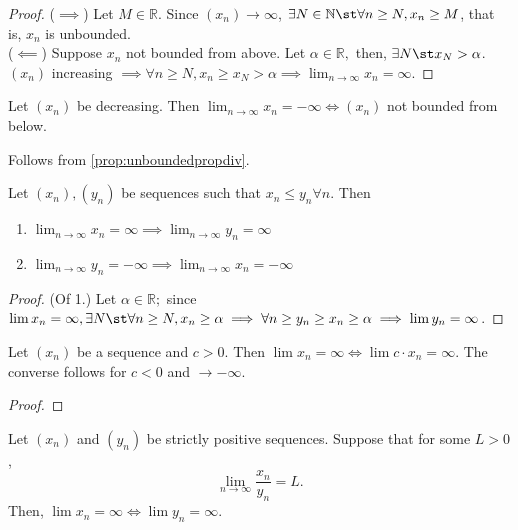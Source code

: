 \documentclass[12pt]{article}
\begin{document}
\begin{proof}
  ($\implies$) Let $M \in \mathbb{R}$. Since $(x_n) \to \infty$, $\exists N \in \mathbb{N} \st \forall n \geq N, x_n \geq M$, that is, $x_n$ is unbounded.\\
  ($\impliedby$) Suppose $x_n$ not bounded from above. Let $\alpha \in \mathbb{R},$ then, $\exists N \st x_N > \alpha$. $(x_n)$ increasing $\implies \forall n \geq N, x_n \geq x_N > \alpha \implies \lim_{n\to\infty} x_n = \infty$.
\end{proof}
\begin{proposition}
  Let $(x_n)$ be decreasing. Then $\lim_{n\to\infty} x_n = - \infty \iff (x_n)$ not bounded from below.
\end{proposition}
\begin{remark}
  Follows from \cref{prop:unboundedpropdiv}.
\end{remark}

\begin{proposition}
  Let $(x_n), (y_n)$ be sequences such that $x_n \leq y_n \forall n$. Then \begin{enumerate}
    \item $\lim_{n\to\infty} x_n = \infty \implies \lim_{n\to\infty} y_n = \infty$
    \item $\lim_{n\to\infty} y_n = -\infty \implies \lim_{n\to\infty} x_n = -\infty$
  \end{enumerate}
\end{proposition}

\begin{proof}(Of 1.) Let $\alpha \in \mathbb{R};$ since $\lim x_n = \infty, \exists N \st \forall n \geq N, x_n \geq \alpha \implies \forall n \geq y_n \geq x_n \geq \alpha \implies \lim y_n = \infty$.
\end{proof}

\begin{proposition}
  Let $(x_n)$ be a sequence and $c > 0$. Then $\lim x_n = \infty \iff \lim c \cdot x_n = \infty$. The converse follows for $c < 0$ and $\to - \infty$.
\end{proposition}
\begin{proof}
\end{proof}

\begin{proposition}
  Let $(x_n)$ and $(y_n)$ be strictly positive sequences. Suppose that for some $L > 0$, \[
  \lim_{n \to\infty} \frac{x_n}{y_n} = L.
  \]
  Then, $\lim x_n = \infty \iff \lim y_n = \infty$.
\end{proposition}
\end{document}
